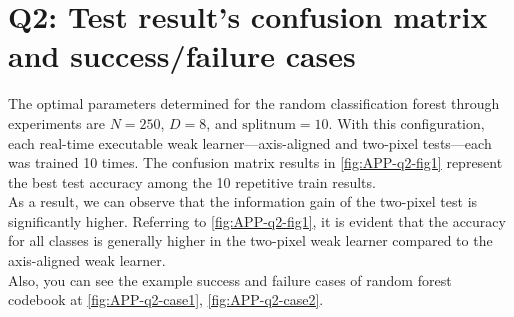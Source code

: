 \section{Q2: Test result's confusion matrix and success/failure cases}
\label{subsec:Q2-app1}
The optimal parameters determined for the random classification forest through experiments are $N=250$, $D=8$, and $\text{splitnum}=10$. With this configuration, each real-time executable weak learner—axis-aligned and two-pixel tests—each was trained 10 times. The confusion matrix results in \cref{fig:APP-q2-fig1} represent the best test accuracy among the 10 repetitive train results.\\
As a result, we can observe that the information gain of the two-pixel test is significantly higher. Referring to \cref{fig:APP-q2-fig1}, it is evident that the accuracy for all classes is generally higher in the two-pixel weak learner compared to the axis-aligned weak learner.\\
Also, you can see the example success and failure cases of random forest codebook at \cref{fig:APP-q2-case1}, \cref{fig:APP-q2-case2}.

